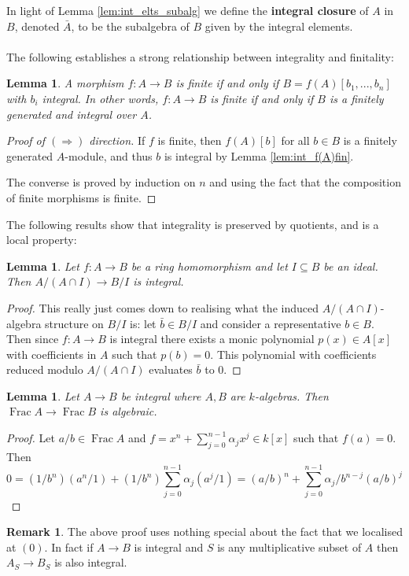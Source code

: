 \documentclass[12pt]{article}
\theoremstyle{plain}
\newtheorem{lemma}[thm]{Lemma}
\theoremstyle{definition}
\newtheorem{remark}[thm]{Remark}
\newcommand{\lto}{\longrightarrow}
\begin{document}
	In light of Lemma \ref{lem:int_elts_subalg} we define the \textbf{integral closure} of $A$ in $B$, denoted $\bar{A}$, to be the subalgebra of $B$ given by the integral elements.\\\\
	The following establishes a strong relationship between integrality and finitality:
	\begin{lemma}\label{lem:finite_integral}
		A morphism $f: A \to B$ is finite if and only if $B = f(A)[b_1,...,b_n]$ with $b_i$ integral. In other words, $f: A \to B$ is finite if and only if $B$ is a finitely generated and integral over $A$.
	\end{lemma}
	\begin{proof}[Proof of $(\Rightarrow)$ direction]
		If $f$ is finite, then $f(A)[b]$ for all $b \in B$ is a finitely generated $A$-module, and thus $b$ is integral by Lemma \ref{lem:int_f(A)fin}.
		
		The converse is proved by induction on $n$ and using the fact that the composition of finite morphisms is finite.
	\end{proof}
	The following results show that integrality is preserved by quotients, and is a local property:
	\begin{lemma}
		\label{lem:quotient_integrality}
		Let $f: A \lto B$ be a ring homomorphism and let $I \subseteq B$ be an ideal. Then $A/(A \cap I) \lto B/I$ is integral.
	\end{lemma}
	\begin{proof}
		This really just comes down to realising what the induced $A/(A \cap I)$-algebra structure on $B/I$ is: let $\bar{b} \in B/I$ and consider a representative $b \in B$. Then since $f:A \lto B$ is integral there exists a monic polynomial $p(x) \in A[x]$ with coefficients in $A$ such that $p(b) = 0$. This polynomial with coefficients reduced modulo $A/(A \cap I)$ evaluates $\bar{b}$ to 0.
	\end{proof}
	\begin{lemma}
		\label{lem:int_implies_alg} Let $A \lto B$ be integral where $A,B$ are $k$-algebras. Then $\operatorname{Frac}A \lto \operatorname{Frac}B$ is algebraic.
	\end{lemma}
	\begin{proof}
		Let $a/b \in \operatorname{Frac}A$ and $f = x^n + \sum_{j = 0}^{n-1}\alpha_j x^j \in k[x]$ such that $f(a) = 0$. Then
		\[0 = (1/b^n)(a^n/1) + (1/b^n)\sum_{j = 0}^{n-1}\alpha_j(a^j/1) = (a/b)^n + \sum_{j = 0}^{n-1}\alpha_j/b^{n-j} (a/b)^j\]
	\end{proof}
	\begin{remark}
		The above proof uses nothing special about the fact that we localised at $(0)$. In fact if $A \lto B$ is integral and $S$ is any multiplicative subset of $A$ then $A_S \lto B_S$ is also integral.
	\end{remark}
\end{document}
